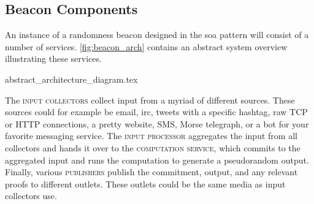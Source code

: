 \subsection{Beacon Components}%
\label{sub:components_of_a_beacon}

An instance of a randomness beacon designed in the \gls{soa} pattern will consist of a number of services. \cref{fig:beacon_arch} contains an abstract system overview illustrating these services.

{abstract_architecture_diagram.tex}

The \textsc{input collectors} collect input from a myriad of different sources. These sources could for example be email, irc, tweets with a specific hashtag, raw TCP or HTTP connections, a pretty website, SMS, Morse telegraph, or a bot for your favorite messaging service.
The \textsc{input processor} aggregates the input from all collectors and hands it over to the \textsc{computation service}, which commits to the aggregated input and runs the computation to generate a pseudorandom output.
Finally, various \textsc{publishers} publish the commitment, output, and any relevant proofs to different outlets. These outlets could be the same media as input collectors use.
